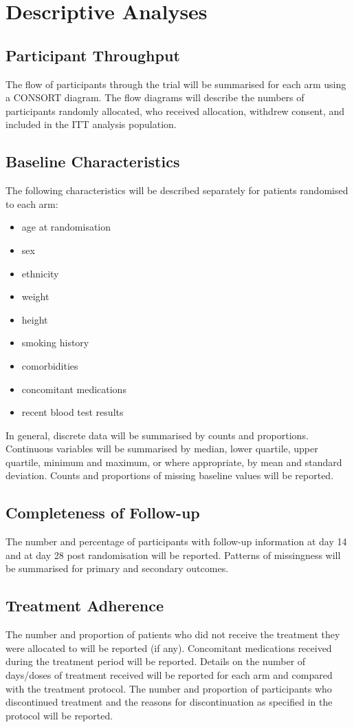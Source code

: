 \documentclass[11pt,parskip=half-]{scrartcl}
\begin{document}
\clearpage

\section{Descriptive Analyses}

\subsection{Participant Throughput}
The flow of participants through the trial will be summarised for each arm using a CONSORT diagram. The flow diagrams will describe the numbers of participants randomly allocated, who received allocation, withdrew consent, and included in the ITT analysis population.

\subsection{Baseline Characteristics}
The following characteristics will be described separately for patients randomised to each arm:
\begin{itemize}
    \item age at randomisation
    \item sex
    \item ethnicity
    \item weight
    \item height
    \item smoking history
    \item comorbidities
    \item concomitant medications
    \item recent blood test results
\end{itemize}
In general, discrete data will be summarised by counts and proportions. Continuous variables will be summarised by median, lower quartile, upper quartile, minimum and maximum, or where appropriate, by mean and standard deviation. Counts and proportions of missing baseline values will be reported.

\subsection{Completeness of Follow-up}
The number and percentage of participants with follow-up information at day 14 and at day 28 post randomisation will be reported. Patterns of missingness will be summarised for primary and secondary outcomes.

\subsection{Treatment Adherence}
The number and proportion of patients who did not receive the treatment they were allocated to will be reported (if any). Concomitant medications received during the treatment period will be reported. Details on the number of days/doses of treatment received will be reported for each arm and compared with the treatment protocol. The number and proportion of participants who discontinued treatment and the reasons for discontinuation as specified in the protocol will be reported.
\end{document}
